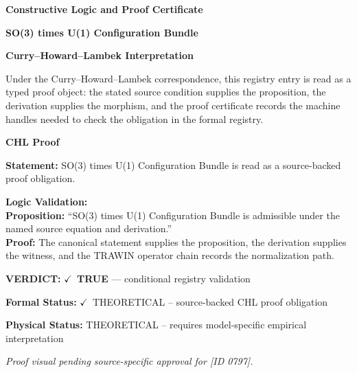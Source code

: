 \clearpage
\begingroup\tzpsupportsetup
\noindent\textbf{\fontsize{10.8pt}{12.8pt}\selectfont [ID 0797] Constructive Logic and Proof Certificate}\par
\noindent\textbf{\fontsize{10pt}{12pt}\selectfont SO(3) times U(1) Configuration Bundle}\par
\vspace{0.45em}
\begingroup
\footnotesize
\setlength{\parskip}{0.22em}
\setlength{\parindent}{0pt}
\noindent\textbf{Curry--Howard--Lambek Interpretation}\par
Under the Curry--Howard--Lambek correspondence, this registry entry is read as a typed proof
object: the stated source condition supplies the proposition, the derivation supplies the
morphism, and the proof certificate records the machine handles needed to check the obligation
in the formal registry.

\vspace{0.45em}
\noindent\textbf{CHL Proof}\par
\textbf{Statement:} SO(3) times U(1) Configuration Bundle is read as a source-backed proof obligation.

\textbf{Logic Validation:}\\
\textbf{Proposition:} ``SO(3) times U(1) Configuration Bundle is admissible under the named source equation and derivation.''\\
\textbf{Proof:} The canonical statement supplies the proposition, the derivation supplies the witness, and the TRAWIN operator chain records the normalization path.

\textbf{VERDICT:} \ensuremath{\checkmark}\ \textbf{TRUE} --- conditional registry validation

\textbf{Formal Status:} \ensuremath{\checkmark}\ THEORETICAL -- source-backed CHL proof obligation

\textbf{Physical Status:} THEORETICAL -- requires model-specific empirical interpretation
\par\vspace{0.45em}
\par
\vfill
\begingroup\footnotesize\itshape
Proof visual pending source-specific approval for [ID 0797].
\par\endgroup
\vfill
\endgroup
\endgroup
